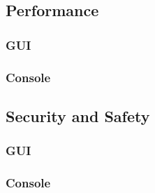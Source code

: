 \documentclass{article}
\begin{document}
%
%
\subsection{Performance}
\subsubsection{GUI}
\subsubsection{Console}

%
%
\subsection{Security and Safety}
\subsubsection{GUI}
\subsubsection{Console}
\end{document}
